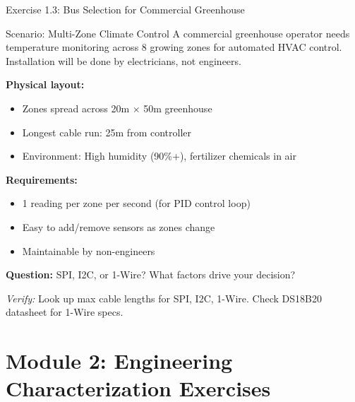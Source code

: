 \documentclass[aspectratio=169,11pt]{beamer}
\begin{document}
\begin{frame}{Exercise 1.3: Bus Selection for Commercial Greenhouse}
    \begin{block}{Scenario: Multi-Zone Climate Control}
        A commercial greenhouse operator needs temperature monitoring across 8 growing zones for automated HVAC control. Installation will be done by electricians, not engineers.
        
        \vspace{0.2cm}
        \textbf{Physical layout:}
        \begin{itemize}
            \item Zones spread across 20m $\times$ 50m greenhouse
            \item Longest cable run: 25m from controller
            \item Environment: High humidity (90\%+), fertilizer chemicals in air
        \end{itemize}
        
        \vspace{0.2cm}
        \textbf{Requirements:}
        \begin{itemize}
            \item 1 reading per zone per second (for PID control loop)
            \item Easy to add/remove sensors as zones change
            \item Maintainable by non-engineers
        \end{itemize}
    \end{block}
    
    \textbf{Question:} SPI, I2C, or 1-Wire? What factors drive your decision?
    
    {\footnotesize \textit{Verify:} Look up max cable lengths for SPI, I2C, 1-Wire. Check DS18B20 datasheet for 1-Wire specs.}
\end{frame}

\section{Module 2: Engineering Characterization Exercises}
\end{document}
